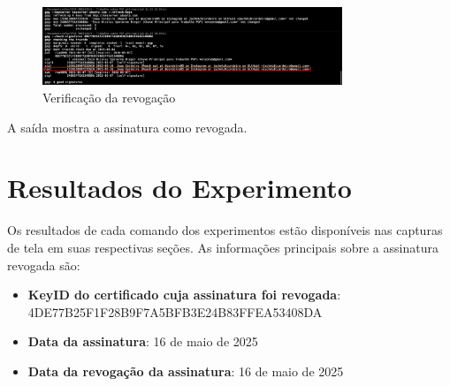 \begin{figure}[htb]
    \centering
    \includegraphics[width=0.8\textwidth]{images/03-verificacao_revogacao.jpeg}
    \caption{Verificação da revogação}
    \label{fig:verificacao-revogacao-assinatura}
\end{figure}

A saída mostra a assinatura como revogada.

\section{Resultados do Experimento}

Os resultados de cada comando dos experimentos estão disponíveis nas capturas de tela em suas respectivas seções. As informações principais sobre a assinatura revogada são:

\begin{itemize}
    \item \textbf{KeyID do certificado cuja assinatura foi revogada}: 4DE77B25F1F28B9F7A5BFB3E24B83FFEA53408DA
    \item \textbf{Data da assinatura}: 16 de maio de 2025
    \item \textbf{Data da revogação da assinatura}: 16 de maio de 2025
\end{itemize}